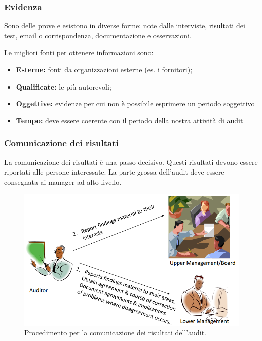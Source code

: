 \subsubsection{Evidenza}

Sono delle prove e esistono in diverse forme: note dalle interviste, risultati 
dei test, email o corrispondenza, documentazione e osservazioni.

Le migliori fonti per ottenere informazioni sono:
\begin{itemize}
\item \textbf{Esterne:} fonti da organizzazioni esterne (es. i fornitori);
\item \textbf{Qualificate:} le più autorevoli;
\item \textbf{Oggettive:} evidenze per cui non è possibile esprimere un periodo 
soggettivo
\item \textbf{Tempo:} deve essere coerente con il periodo della nostra attività 
di audit
\end{itemize}

\subsubsection{Comunicazione dei risultati}

La comunicazione dei risultati è una passo decisivo. Questi risultati devono
essere riportati alle persone interessate.
La parte grossa dell'audit deve essere consegnata ai manager ad alto
livello.

\begin{figure}[h!]
        \begin{center}
                \includegraphics[scale=0.45]{res/img/communication_audit.png}
        \end{center}
        \caption{Procedimento per la comunicazione dei risultati dell'audit.}
\end{figure}

